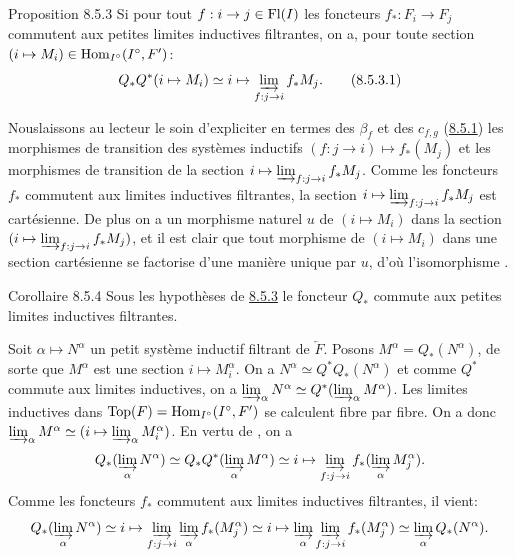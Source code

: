 \documentclass[10pt]{../fichiers-configuration-latex/smfart}
\begin{document}
\begin{enonce*}{Proposition 8.5.3}
Si pour tout $f : i \to j \in \text{\rm Fl}(I)$ les foncteurs
$f_{\ast} : F_i \to F_j$ commutent aux petites limites inductives filtrantes, on a, pour toute
section $(i \mapsto M_i) \in \operatorname{Hom}_{I^{\circ}}(I^{\circ}, F')$:
\begin{equation*}
Q_{\ast} Q^{\ast} (i \mapsto M_i) \simeq i \mapsto
\varinjlim_{f : j \to i} f_{\ast} M_j{\quoi}.\tag{8.5.3.1}
\end{equation*}
\end{enonce*}

\noindent Nous\pageoriginale laissons au lecteur le soin
d'expliciter en termes des $\beta_f$  et des $c_{f,
g}$ (\hyperref[VI.subsubsec8.5.1]{8.5.1}) les morphismes de transition des
systèmes inductifs $(f : j \to i) \mapsto f_{\ast}(M_j)$ et les
morphismes de transition de la section $i \mapsto \varinjlim_{f : j
\to i} f_{\ast} M_{j}$. Comme les foncteurs $f_{\ast}$ commutent aux
limites inductives filtrantes, la section $i\mapsto
\varinjlim_{f:j\to i} f_{\ast}M_{j}$ est cartésienne. De plus on a
un morphisme naturel $u$ de $(i \mapsto M_i)$ dans la section $(i
\mapsto \varinjlim_{f
  : j \to i}f_{\ast} M_j)$, et il est clair que tout morphisme de $(i
\mapsto M_i)$ dans une section cartésienne se factorise d'une manière
unique par $u$, d'où l'isomorphisme .

\begin{enonce*}{Corollaire 8.5.4}
Sous les hypothèses de \hyperref[VI.prop8.5.3]{8.5.3} le foncteur $Q_{\ast}$ commute aux
petites limites inductives filtrantes.
\end{enonce*}

Soit $\alpha \mapsto N^{\alpha}$ un petit système inductif filtrant de
$\underleftarrow{F}$. Posons $M^{\alpha} = Q_{\ast} (N^{\alpha})$, de
sorte que $M^{\alpha}$ est une section $i \mapsto M^{\alpha}_i$. On a
$N^{\alpha} \simeq Q^{\ast} Q_{\ast} (N^{\alpha})$ et comme $Q^{\ast}$
commute aux limites inductives, on a
$\varinjlim_{\alpha}{N^{\alpha}}\simeq Q^{\ast}
(\varinjlim_{\alpha}{M^{\alpha}})$. Les limites
inductives dans $\operatorname{Top}(F) = \operatorname{Hom}_{I^{\circ}}(I^{\circ}, F')$ se
calculent fibre par
fibre. On a donc $\varinjlim_{\alpha} {M^{\alpha}} \simeq
(i \mapsto \varinjlim_{\alpha}
{M^{\alpha}_{i}})$. En vertu de , on a
$$
Q_{\ast} (\varinjlim_{\alpha} {N}^{\alpha}) \simeq Q_{\ast}
Q^{\ast} (\varinjlim_{\alpha} {M}^{\alpha}) \simeq i \mapsto
\varinjlim_{f : j \to i} f_{\ast}
(\varinjlim_{\alpha} {M}^{\alpha}_j){\quoi}.
$$
Comme les foncteurs $f_{\ast}$ commutent aux limites inductives
filtrantes, il vient:
$$
Q_{\ast} (\varinjlim_{\alpha} {N}^{\alpha}) \simeq i \mapsto
\varinjlim_{f: j\to i} \varinjlim_{\alpha} f_{\ast}
(M^{\alpha}_j) \simeq i \mapsto \varinjlim_{\alpha} \varinjlim_{f:
  j\to i} f_{\ast}
(M^{\alpha}_j) \simeq \varinjlim_{\alpha} Q_{\ast} (N^{\alpha}){\quoi}.
$$
\end{document}
